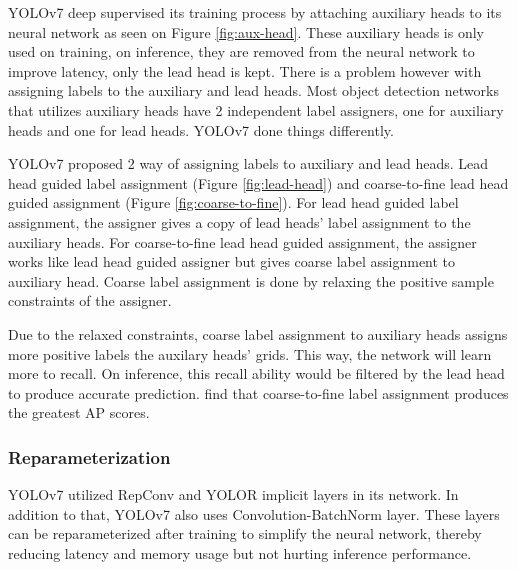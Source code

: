   YOLOv7 deep supervised its training process by attaching auxiliary heads to its neural network
  as seen on Figure \ref{fig:aux-head}.
  These auxiliary heads is only used on training, on inference, they are removed from the neural network
  to improve latency, only the lead head is kept. There is a problem however with assigning labels
  to the auxiliary and lead heads. Most object detection networks that utilizes auxiliary heads have 2
  independent label assigners, one for auxiliary heads and one for lead heads. YOLOv7 done things differently.


  YOLOv7 proposed 2 way of assigning labels to auxiliary and lead heads. Lead head guided label assignment (Figure \ref{fig:lead-head}) and
  coarse-to-fine lead head guided assignment (Figure \ref{fig:coarse-to-fine}). For lead head guided label assignment, the assigner gives a copy
  of lead heads' label assignment to the auxiliary heads. For coarse-to-fine lead head guided assignment, the 
  assigner works like lead head guided assigner but gives coarse label assignment to auxiliary head. Coarse label
  assignment is done by relaxing the positive sample constraints of the assigner.   

  Due to the relaxed constraints, coarse label assignment to auxiliary heads assigns more positive labels the auxilary heads' grids. 
  This way, the network will learn more to recall.
  On inference, this recall ability would be filtered by the lead head to produce accurate prediction.
  \textcite{yolov7} find that coarse-to-fine
  label assignment produces the greatest AP scores.


  \subsubsection{Reparameterization}
  YOLOv7 utilized RepConv and YOLOR implicit layers in its network.
  In addition to that, YOLOv7 also uses Convolution-BatchNorm layer.
  These layers can be reparameterized after training to simplify the neural network, thereby reducing
  latency and memory usage but not hurting inference performance.

